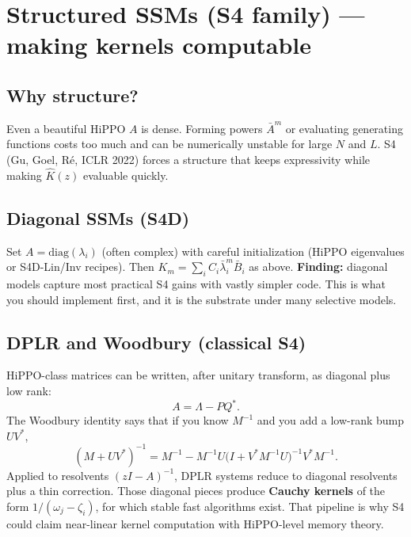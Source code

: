 \documentclass[11pt,a4paper]{article}
\begin{document}
\section{Structured SSMs (S4 family) --- making kernels computable}

\subsection{Why structure?}

Even a beautiful HiPPO $A$ is dense.
Forming powers $\bar{A}^m$ or evaluating generating functions costs too much and can be numerically unstable for large $N$ and $L$.
S4 (Gu, Goel, R\'{e}, ICLR 2022) forces a structure that keeps expressivity while making $\hat{K}(z)$ evaluable quickly.

\subsection{Diagonal SSMs (S4D)}

Set $A=\mathrm{diag}(\lambda_i)$ (often complex) with careful initialization (HiPPO eigenvalues or S4D-Lin/Inv recipes).
Then $K_m=\sum_i C_i\bar\lambda_i^m\bar B_i$ as above.
\textbf{Finding:} diagonal models capture most practical S4 gains with vastly simpler code.
This is what you should implement first, and it is the substrate under many selective models.

\subsection{DPLR and Woodbury (classical S4)}

HiPPO-class matrices can be written, after unitary transform, as diagonal plus low rank:
\begin{equation}
A=\Lambda-PQ^\ast.
\end{equation}
The Woodbury identity says that if you know $M^{-1}$ and you add a low-rank bump $UV^\ast$,
\begin{equation}
(M+UV^\ast)^{-1}
=M^{-1}-M^{-1}U\big(I+V^\ast M^{-1}U\big)^{-1}V^\ast M^{-1}.
\end{equation}
Applied to resolvents $(zI-A)^{-1}$, DPLR systems reduce to diagonal resolvents plus a thin correction.
Those diagonal pieces produce \textbf{Cauchy kernels} of the form $1/(\omega_j-\zeta_i)$, for which stable fast algorithms exist.
That pipeline is why S4 could claim near-linear kernel computation with HiPPO-level memory theory.
\end{document}
